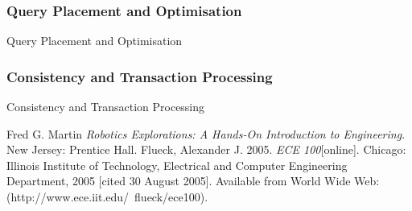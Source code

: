 \documentclass[a4paper, 11pt]{article}
\begin{document}
\subsubsection*{Query Placement and Optimisation}
Query Placement and Optimisation

\subsubsection*{Consistency and Transaction Processing}
Consistency and Transaction Processing


\begin{thebibliography}{9}
 Fred G. Martin \emph{Robotics Explorations: A Hands-On Introduction to Engineering}. New Jersey: Prentice Hall.
  Flueck, Alexander J. 2005. \emph{ECE 100}[online]. Chicago: Illinois Institute of Technology, Electrical and Computer Engineering Department, 2005 [cited 30
August 2005]. Available from World Wide Web: (http://www.ece.iit.edu/~flueck/ece100).
\end{thebibliography}
\end{document}
